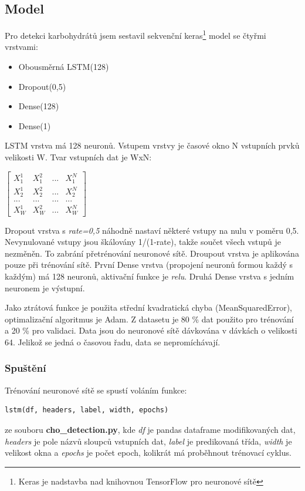 \subsection{Model}

Pro detekci karbohydrátů jsem sestavil sekvenční keras\footnote{Keras je nadstavba nad knihovnou TensorFlow pro neuronové sítě} model se čtyřmi vrstvami:
\begin{itemize}
\setlength\itemsep{0em}
\item Obousměrná LSTM(128)
\item Dropout(0,5)
\item Dense(128)
\item Dense(1)
\end{itemize}

LSTM vrstva má 128 neuronů. Vstupem vrstvy je časové okno N vstupních prvků velikosti W. Tvar vstupních dat je WxN:

$\begin{bmatrix}
X^{1}_{1} & X^{2}_{1} & ... & X^{N}_{1}\\
X^{1}_{2} & X^{2}_{2} & ... & X^{N}_{2}\\
... & ... & ... & ...\\
X^{1}_{W} & X^{2}_{W} & ... & X^{N}_{W}
\end{bmatrix}$

Dropout vrstva s \textit{rate=0,5} náhodně nastaví některé vstupy na nulu v poměru 0,5. Nevynulované vstupy jsou škálovány 1/(1-rate), takže součet všech vstupů je nezměněn. To zabrání přetrénování neuronové sítě. Droupout vrstva je aplikována pouze při trénování sítě. První Dense vrstva (propojení neuronů formou každý s každým) má 128 neuronů, aktivační funkce je \textit{relu}. Druhá Dense vrstva s jedním neuronem je výstupní.

Jako ztrátová funkce je použita střední kvadratická chyba (MeanSquaredError), optimalizační algoritmus je Adam. Z datasetu je 80 \% dat použito pro trénování a 20 \% pro validaci. Data jsou do neuronové sítě dávkována v dávkách o velikosti 64. Jelikož se jedná o časovou řadu, data se nepromíchávají.

\subsubsection{Spuštění}

Trénování neuronové sítě se spustí voláním funkce:
\begin{verbatim}
lstm(df, headers, label, width, epochs)
\end{verbatim}
ze souboru \textbf{cho\_detection.py}, kde \textit{df} je pandas dataframe modifikovaných dat, \textit{headers} je pole názvů sloupců vstupních dat, \textit{label} je predikovaná třída, \textit{width} je velikost okna a \textit{epochs} je počet epoch, kolikrát má proběhnout trénovací cyklus.

